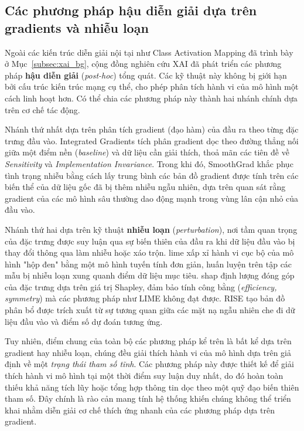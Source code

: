 \subsection{Các phương pháp hậu diễn giải dựa trên gradients và nhiễu loạn}
\label{subsec:background_post_hoc}

Ngoài các kiến trúc diễn giải nội tại như Class Activation Mapping đã trình bày ở Mục~\ref{subsec:xai_bg}, cộng đồng nghiên cứu XAI đã phát triển các phương pháp \textbf{hậu diễn giải} (\emph{post-hoc}) tổng quát. Các kỹ thuật này không bị giới hạn bởi cấu trúc kiến trúc mạng cụ thể, cho phép phân tích hành vi của mô hình một cách linh hoạt hơn. Có thể chia các phương pháp này thành hai nhánh chính dựa trên cơ chế tác động.

Nhánh thứ nhất dựa trên phân tích gradient (đạo hàm) của đầu ra theo từng đặc trưng đầu vào. Integrated Gradients \cite{sundararajan2017axiomatic} tích phân gradient dọc theo đường thẳng nối giữa một điểm nền (\emph{baseline}) và dữ liệu cần giải thích, thoả mãn các tiên đề về \emph{Sensitivity} và \emph{Implementation Invariance}. Trong khi đó, SmoothGrad \cite{smilkov2017smoothgrad} khắc phục tình trạng nhiễu bằng cách lấy trung bình các bản đồ gradient được tính trên các biến thể của dữ liệu gốc đã bị thêm nhiễu ngẫu nhiên, dựa trên quan sát rằng gradient của các mô hình sâu thường dao động mạnh trong vùng lân cận nhỏ của đầu vào.

Nhánh thứ hai dựa trên kỹ thuật \textbf{nhiễu loạn} (\emph{perturbation}), nơi tầm quan trọng của đặc trưng được suy luận qua sự biến thiên của đầu ra khi dữ liệu đầu vào bị thay đổi thông qua làm nhiễu hoặc xáo trộn. \acrfull{lime} \cite{ribeiro2016lime} xấp xỉ hành vi cục bộ của mô hình "hộp đen" bằng một mô hình tuyến tính đơn giản, huấn luyện trên tập các mẫu bị nhiễu loạn xung quanh điểm dữ liệu mục tiêu. \acrfull{shap} \cite{lundberg2017unified} định lượng đóng góp của đặc trưng dựa trên giá trị Shapley, đảm bảo tính công bằng (\emph{efficiency, symmetry}) mà các phương pháp như LIME không đạt được. RISE \cite{petsiuk2018rise} tạo bản đồ phân bổ được trích xuất từ sự tương quan giữa các mặt nạ ngẫu nhiên che đi dữ liệu đầu vào và điểm số dự đoán tương ứng.

Tuy nhiên, điểm chung của toàn bộ các phương pháp kể trên là bất kể dựa trên gradient hay nhiễu loạn, chúng đều giải thích hành vi của mô hình dựa trên giả định về một \emph{trạng thái tham số tĩnh}. Các phương pháp này được thiết kế để giải thích hành vi mô hình tại một thời điểm suy luận duy nhất, do đó hoàn toàn thiếu khả năng tích lũy hoặc tổng hợp thông tin dọc theo một quỹ đạo biến thiên tham số. Đây chính là rào cản mang tính hệ thống khiến chúng không thể triển khai nhằm diễn giải cơ chế thích ứng nhanh của các phương pháp dựa trên gradient. 

